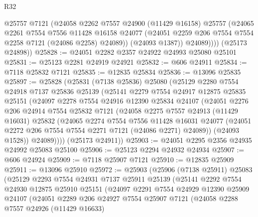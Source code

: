 \begin{lexlean}{R32}
\begin{coremodule}
              @25757
              @7121
              (@24058
                @2262
                @7557
                @24900
                (@11429 @16158)
                @25757
                (@24065
                  @2261
                  @7554
                  @7556
                  @11428
                  @16158
                  @24077
                  (@24051 @2259 @206 @7554 @7554 @2258 @7121 (@24086 @2258) @24089))
                (@24093 @1387))
              @24089))))
      (@25173 @24898))
@25828 := @24051 @2282 @2357 @24922 @24993 @25080 @25101
@25831 := @25123 @2281 @24919 @24921
@25832 := @606 @24911
@25834 := @7118 @25832 @7121
@25835 := @12835 @25834
@25836 := @13096 @25835
@25897 := @25828
    (@25831
      (@7138 @25836)
      @25080
      (@25129
        @2280
        @7554
        @24918
        @7137
        @25836
        @25139
        (@25141
          @2279
          @7554
          @24917
          @12875
          @25835
          @25151
          (@24097
            @2278
            @7554
            @24916
            @12390
            @25834
            @24107
            (@24051
              @2276
              @206
              @24914
              @7554
              @25832
              @7121
              (@24058
                @2275
                @7557
                @24913
                (@11429 @16031)
                @25832
                (@24065
                  @2274
                  @7554
                  @7556
                  @11428
                  @16031
                  @24077
                  (@24051 @2272 @206 @7554 @7554 @2271 @7121 (@24086 @2271) @24089))
                (@24093 @1528))
              @24089))))
      (@25173 @24911))
@25903 := @24051 @2295 @2356 @24935 @24992 @25083 @25100
@25906 := @25123 @2294 @24932 @24934
@25907 := @606 @24924
@25909 := @7118 @25907 @7121
@25910 := @12835 @25909
@25911 := @13096 @25910
@25972 := @25903
    (@25906
      (@7138 @25911)
      @25083
      (@25129
        @2293
        @7554
        @24931
        @7137
        @25911
        @25139
        (@25141
          @2292
          @7554
          @24930
          @12875
          @25910
          @25151
          (@24097
            @2291
            @7554
            @24929
            @12390
            @25909
            @24107
            (@24051
              @2289
              @206
              @24927
              @7554
              @25907
              @7121
              (@24058
                @2288
                @7557
                @24926
                (@11429 @16633)

\end{coremodule}
\end{lexlean}

